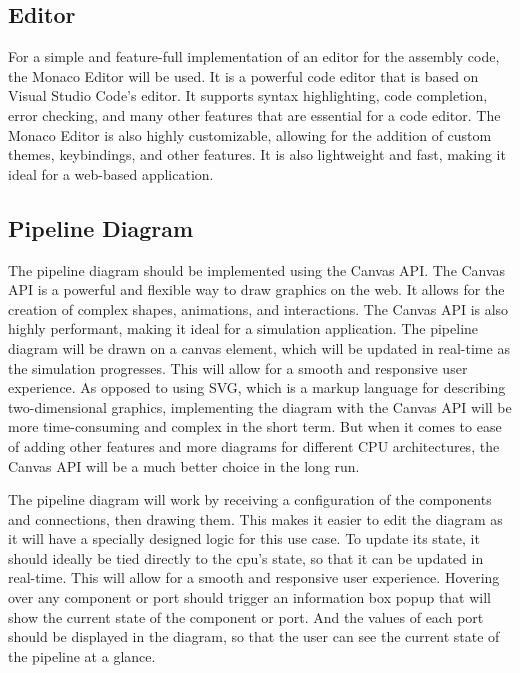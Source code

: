 \subsection{Editor}
For a simple and feature-full implementation of an editor for the assembly code, the Monaco Editor will be used. It is a powerful code editor that is based on Visual Studio Code's editor. It supports syntax highlighting, code completion, error checking, and many other features that are essential for a code editor. The Monaco Editor is also highly customizable, allowing for the addition of custom themes, keybindings, and other features. It is also lightweight and fast, making it ideal for a web-based application.

\subsection{Pipeline Diagram}
The pipeline diagram should be implemented using the Canvas API. The Canvas API is a powerful and flexible way to draw graphics on the web. It allows for the creation of complex shapes, animations, and interactions. The Canvas API is also highly performant, making it ideal for a simulation application. The pipeline diagram will be drawn on a canvas element, which will be updated in real-time as the simulation progresses. This will allow for a smooth and responsive user experience. 
As opposed to using SVG, which is a markup language for describing two-dimensional graphics, implementing the diagram with the Canvas API will be more time-consuming and complex in the short term. But when it comes to ease of adding other features and more diagrams for different CPU architectures, the Canvas API will be a much better choice in the long run.

The pipeline diagram will work by receiving a configuration of the components and connections, then drawing them. This makes it easier to edit the diagram as it will have a specially designed logic for this use case. To update its state, it should ideally be tied directly to the cpu's state, so that it can be updated in real-time. This will allow for a smooth and responsive user experience. Hovering over any component or port should trigger an information box popup that will show the current state of the component or port. And the values of each port should be displayed in the diagram, so that the user can see the current state of the pipeline at a glance.

